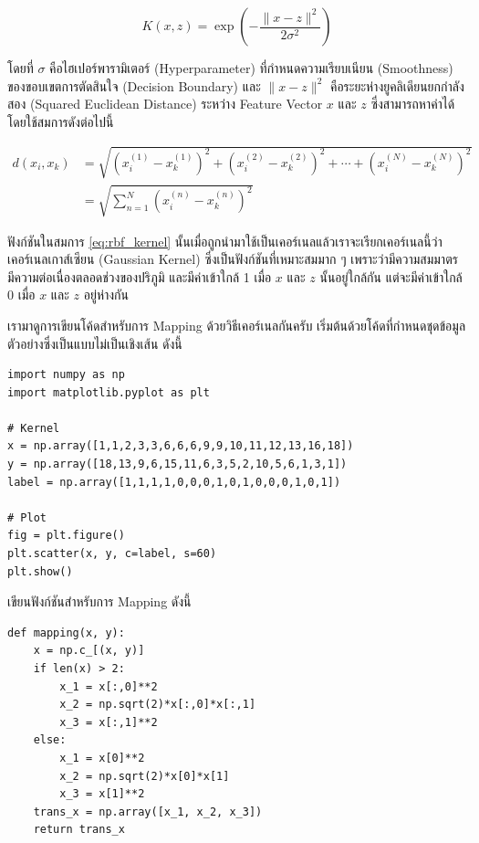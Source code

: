 \begin{equation}\label{eq:rbf_kernel}
    K(x,z) = \exp\left(-\frac{\lVert x - z \rVert^2}{2\sigma^2}\right)   
\end{equation}

\noindent โดยที่ $\sigma$ คือไฮเปอร์พารามิเตอร์ (Hyperparameter) ที่กำหนดความเรียบเนียน (Smoothness) ของขอบเขตการตัดสินใจ 
(Decision Boundary) และ $\lVert x - z \rVert^2$ คือระยะห่างยูคลิเดียนยกกำลังสอง (Squared Euclidean Distance) ระหว่าง 
Feature Vector $x$ และ $z$ ซึ่งสามารถหาค่าได้โดยใช้สมการดังต่อไปนี้

\begin{align}
    d(x_{i}, x_{k}) &= 
    \sqrt{(x^{(1)}_{i} - x^{(1)}_{k})^{2} + (x^{(2)}_{i} - x^{(2)}_{k})^{2} + \cdots + 
    (x^{(N)}_{i} - x^{(N)}_{k})^{2}} \\
    &= \sqrt{\sum^{N}_{n=1} (x^{(n)}_{i} - x^{(n)}_{k})^{2}}
\end{align}

ฟังก์ชันในสมการ \ref{eq:rbf_kernel} นั้นเมื่อถูกนำมาใช้เป็นเคอร์เนลแล้วเราจะเรียกเคอร์เนลนี้ว่าเคอร์เนลเกาส์เซียน (Gaussian Kernel)
ซึ่งเป็นฟังก์ชันที่เหมาะสมมาก ๆ เพราะว่ามีความสมมาตร มีความต่อเนื่องตลอดช่วงของปริภูมิ และมีค่าเข้าใกล้ 1 เมื่อ $x$ และ $z$ นั้นอยู่ใกล้กัน 
แต่จะมีค่าเข้าใกล้ 0 เมื่อ $x$ และ $z$ อยู่ห่างกัน

เรามาดูการเขียนโค้ดสำหรับการ Mapping ด้วยวิธีเคอร์เนลกันครับ เริ่มต้นด้วยโค้ดที่กำหนดชุดข้อมูลตัวอย่างซึ่งเป็นแบบไม่เป็นเชิงเส้น ดังนี้

\begin{lstlisting}[style=MyPython]
import numpy as np
import matplotlib.pyplot as plt

# Kernel
x = np.array([1,1,2,3,3,6,6,6,9,9,10,11,12,13,16,18])
y = np.array([18,13,9,6,15,11,6,3,5,2,10,5,6,1,3,1])
label = np.array([1,1,1,1,0,0,0,1,0,1,0,0,0,1,0,1])

# Plot
fig = plt.figure()
plt.scatter(x, y, c=label, s=60)
plt.show()
\end{lstlisting}

\vspace{1em}
\noindent เขียนฟังก์ชันสำหรับการ Mapping ดังนี้

\begin{lstlisting}[style=MyPython]
def mapping(x, y):    
	x = np.c_[(x, y)]				
    if len(x) >	2:        
    	x_1 = x[:,0]**2        
        x_2 = np.sqrt(2)*x[:,0]*x[:,1]        
        x_3 = x[:,1]**2								
    else:            
    	x_1 = x[0]**2        
        x_2 = np.sqrt(2)*x[0]*x[1]        
        x_3 = x[1]**2			    
    trans_x = np.array([x_1, x_2, x_3])				
    return trans_x	
\end{lstlisting}

